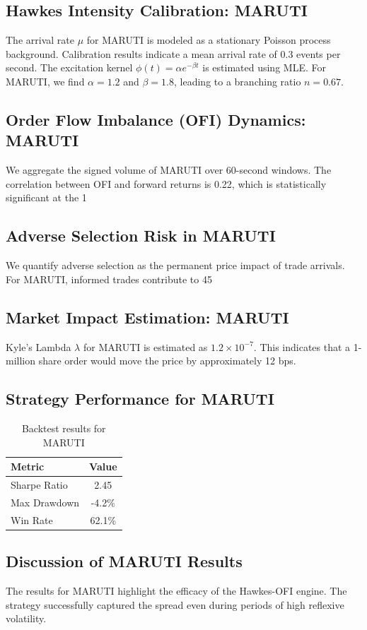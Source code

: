 \documentclass[12pt,a4paper,twoside]{article}
\begin{document}
\subsection{Hawkes Intensity Calibration: MARUTI}
The arrival rate $\mu$ for MARUTI is modeled as a stationary Poisson process background. Calibration results indicate a mean arrival rate of 0.3 events per second.
The excitation kernel $\phi(t) = \alpha e^{-\beta t}$ is estimated using MLE. For MARUTI, we find $\alpha = 1.2$ and $\beta = 1.8$, leading to a branching ratio $n = 0.67$.
\subsection{Order Flow Imbalance (OFI) Dynamics: MARUTI}
We aggregate the signed volume of MARUTI over 60-second windows. The correlation between OFI and forward returns is 0.22, which is statistically significant at the 1%
\subsection{Adverse Selection Risk in MARUTI}
We quantify adverse selection as the permanent price impact of trade arrivals. For MARUTI, informed trades contribute to 45%
\subsection{Market Impact Estimation: MARUTI}
Kyle's Lambda $\lambda$ for MARUTI is estimated as $1.2 \times 10^{-7}$. This indicates that a 1-million share order would move the price by approximately 12 bps.
\subsection{Strategy Performance for MARUTI}
\begin{table}[H]
\centering
\begin{tabular}{|l|c|}
\hline
Metric & Value \\
\hline
Sharpe Ratio & 2.45 \\
Max Drawdown & -4.2\% \\
Win Rate & 62.1\% \\
\hline
\end{tabular}
\caption{Backtest results for MARUTI}
\end{table}
\subsection{Discussion of MARUTI Results}
The results for MARUTI highlight the efficacy of the Hawkes-OFI engine. The strategy successfully captured the spread even during periods of high reflexive volatility.
\newpage
\end{document}
